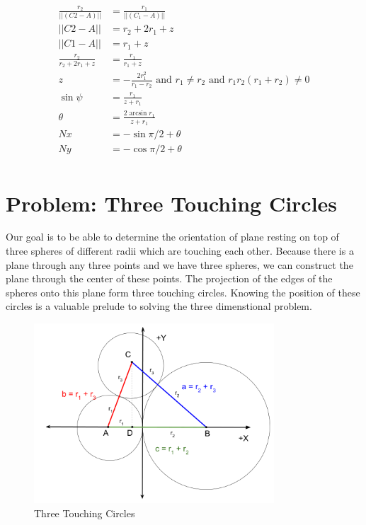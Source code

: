 \documentclass{article}
\begin{document}
\begin{align}
\frac{r_2}{||(C2 - A)||} &= \frac{r_1}{||(C_1-A)||} \\
||C2 - A|| &= r_2+2r_1+z \\
||C1 - A|| &= r_1 + z \\
\frac{r_2}{r_2+2r_1+z} &= \frac{r_1}{r_1+z} \\
z &= -\frac{2 r_1^2}{r_1 - r_2} \text{ and } r_1 \neq r_2 \text{ and } r_1 r_2 (r_1 + r_2) \neq 0 \\
\sin{\psi} &= \frac{r_1}{z + r_1} \\
\theta &= \frac{2 \arcsin{r_1}}{z+r_1} \\
Nx &= -\sin{\pi/2 + \theta} \\
Ny &= -\cos{\pi/2 + \theta} \\
\end{align}

\section{Problem: Three Touching Circles}

Our goal is to be able to determine the orientation of plane resting on top of three spheres of different radii which are touching each
other.
Because there is a plane through any three points and we have three spheres, we can construct the plane through
the center of these points.
The projection of the edges of the spheres onto this plane form three touching circles.
Knowing the position of these circles is a valuable prelude to solving the three dimenstional problem.

\begin{figure}
     \centering
     \includegraphics[width=0.80\textwidth]{figures/ThreeTouchingCircles.png}
     \caption{Three Touching Circles}
  \label{fig:Tangent}
\end{figure}
\end{document}
